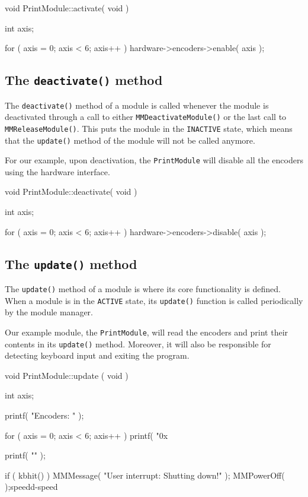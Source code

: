 \begin{codesegment}
void PrintModule::activate( void ) {
  int axis;

  for ( axis = 0; axis < 6; axis++ )
    hardware->encoders->enable( axis );
}
\end{codesegment}

\subsection{The {\tt deactivate()} method}

The {\tt deactivate()} method of a module is called whenever the module is
deactivated through a call to either {\tt MMDeactivateModule()} or the last
call to {\tt MMReleaseModule()}. This puts the module in the {\tt INACTIVE}
state, which means that the {\tt update()} method of the module will not be
called anymore.

For our example, upon deactivation, the {\tt PrintModule} will disable all
the encoders using the hardware interface.

\begin{codesegment}
void PrintModule::deactivate( void ) {
  int axis;

  for ( axis = 0; axis < 6; axis++ )
    hardware->encoders->disable( axis );
}
\end{codesegment}

\subsection{The {\tt update()} method}

The {\tt update()} method of a module is where its core functionality is
defined. When a module is in the {\tt ACTIVE} state, its {\tt update()}
function is called periodically by the module manager.

Our example module, the {\tt PrintModule}, will read the encoders and print
their contents in its {\tt update()} method. Moreover, it will also be
responsible for detecting keyboard input and exiting the program.

\begin{codesegment}
void  PrintModule::update ( void ) {
  int axis;

  printf( "Encoders: " );

  for ( axis = 0; axis < 6; axis++ )
    printf( "0x%

  printf( "\n" );

  if ( kbhit() ) {
    MMMessage( "User interrupt: Shutting down!\n" );
    MMPowerOff( );speedd-speed
  }
}
\end{codesegment}

